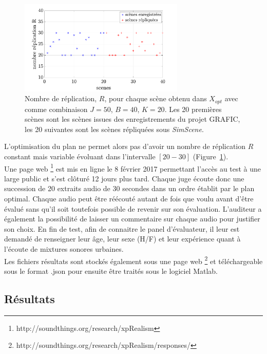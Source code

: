 \begin{figure}[ht]
\centering
\includegraphics[width = 0.7\textwidth]{./figures/test_perceptif/nb_replication.pdf}
\caption{Nombre de réplication, $R$, pour chaque scène obtenu dans $X_{opt}$ avec comme combinaison $J = 50$, $B = 40$, $K = 20$. Les 20 premières scènes sont les scènes issues des enregistrements du projet GRAFIC, les 20 suivantes sont les scènes répliquées sous \textit{SimScene}.}
\label{fig:replication}
\end{figure}

L'optimisation du plan ne permet alors pas d'avoir un nombre de réplication $R$ constant mais variable évoluant dans l'intervalle $\left[20-30 \right]$ (Figure~\ref{fig:replication}). \\

Une page web \footnote{http://soundthings.org/research/xpRealism} est mis en ligne le 8 février 2017 permettant l'accès au test à une large public et s'est clôturé 12 jours plus tard. Chaque juge écoute donc une succession de 20 extraits audio de 30 secondes dans un ordre établit par le plan optimal. Chaque audio peut être réécouté autant de fois que voulu avant d'être évalué sans qu'il soit toutefois possible de revenir sur son évaluation. L'auditeur a également la possibilité de laisser un commentaire sur chaque audio pour justifier son choix. En fin de test, afin de connaitre le panel d'évaluateur, il leur est demandé de renseigner leur âge, leur sexe (H/F) et leur expérience quant à l'écoute de mixtures sonores urbaines.\\

Les fichiers résultats sont stockés également sous une page web \footnote{http://soundthings.org/research/xpRealism/responses/} et téléchargeable sous le format .json pour ensuite être traités sous le logiciel Matlab.\\

\subsection{Résultats}

